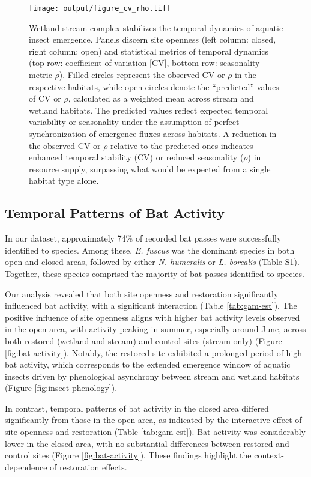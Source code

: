 \documentclass[11pt, class=article, crop=false]{standalone}
\begin{document}
\begin{figure}
    \centering
    \texttt{[image: output/figure\_cv\_rho.tif]}
    \caption{Wetland-stream complex stabilizes the temporal dynamics of aquatic insect emergence. Panels discern site openness (left column: closed, right column: open) and statistical metrics of temporal dynamics (top row: coefficient of variation [CV], bottom row: seasonality metric $\rho$). Filled circles represent the observed CV or $\rho$ in the respective habitats, while open circles denote the ``predicted'' values of CV or $\rho$, calculated as a weighted mean across stream and wetland habitats. The predicted values reflect expected temporal variability or seasonality under the assumption of perfect synchronization of emergence fluxes across habitats. A reduction in the observed CV or $\rho$ relative to the predicted ones indicates enhanced temporal stability (CV) or reduced seasonality ($\rho$) in resource supply, surpassing what would be expected from a single habitat type alone.}
    \label{fig:cv-emergence}
\end{figure}

\subsection{Temporal Patterns of Bat Activity}

In our dataset, approximately 74\% of recorded bat passes were successfully identified to species. Among these, \textit{E. fuscus} was the dominant species in both open and closed areas, followed by either \textit{N. humeralis} or \textit{L. borealis} (Table S1).
Together, these species comprised the majority of bat passes identified to species.

Our analysis revealed that both site openness and restoration significantly influenced bat activity, with a significant interaction (Table \ref{tab:gam-est}).
The positive influence of site openness aligns with higher bat activity levels observed in the open area, with activity peaking in summer, especially around June, across both restored (wetland and stream) and control sites (stream only) (Figure \ref{fig:bat-activity}).
Notably, the restored site exhibited a prolonged period of high bat activity, which corresponds to the extended emergence window of aquatic insects driven by phenological asynchrony between stream and wetland habitats (Figure \ref{fig:insect-phenology}).

In contrast, temporal patterns of bat activity in the closed area differed significantly from those in the open area, as indicated by the interactive effect of site openness and restoration (Table \ref{tab:gam-est}).
Bat activity was considerably lower in the closed area, with no substantial differences between restored and control sites (Figure \ref{fig:bat-activity}).
These findings highlight the context-dependence of restoration effects.
\end{document}
